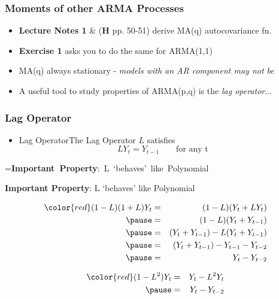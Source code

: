 \documentclass{beamer}
\makeatletter
\newcommand{\mybox}[1]{%
		\setbox0=\hbox{#1}%
		\setlength{\@tempdima}{\dimexpr\wd0+13pt}%
		\begin{tcolorbox}[colframe=ikb, colback=aliceblue ,boxrule=0.5pt,arc=4pt,
			left=6pt,right=6pt,top=6pt,bottom=6pt,boxsep=0pt,width=\@tempdima]
			#1
		\end{tcolorbox}
	}
\makeatother
\begin{document}
\begin{frame}
	\frametitle{Moments of other ARMA Processes}
	\begin{itemize}
		\large 
		\item[] \textbf{Lecture Notes 1} \& (\textbf{H} pp. 50-51) derive MA(q) autocovariance fn.
			\vspace{15pt}
		\pause 
		\item[] \textbf{Exercise 1} asks you to do the same for ARMA(1,1)
			\vspace{25pt}
		\pause 
		\item[] MA(q) always stationary - \textit{models with an AR component may not be}
			\vspace{25pt}
		\pause 
	
		\pause 
		\item[] A  useful tool to study properties of ARMA(p,q)  is the \textit{lag operator}...
		
		
		\end{itemize}
\end{frame}
	
		
		\begin{frame}
			\frametitle{Lag Operator}
			
			\begin{itemize}
				\item[] \begin{mydef*}[width=2.5in]{Lag Operator}The Lag Operator $L$ satisfies
					\begin{equation*} LY_t=Y_{t-1}   \qquad \textrm{for any t} \end{equation*} \end{mydef*}
				
				
				
				\pause
			\end{itemize}\begin{center}
				\mybox{\textbf{Important Property}: L `behaves' like Polynomial}	
			\end{center}
			\pause
	
			
			\vspace{-0.5cm}
			
			\begin{minipage}{.5\linewidth}
				\begin{eqnarray*}
				{\color{red}	(1-L)(1+L)Y_t} &=&(1-L)(Y_t+LY_t)\\ \pause
					&=&(1-L)(Y_t+Y_{t-1})\\\pause
					&=&(Y_t+Y_{t-1})-L(Y_t+Y_{t-1})\\\pause
					&=& (Y_t+Y_{t-1})-Y_{t-1} -Y_{t-2}\\\pause
					&=&Y_{t}-Y_{t-2}
				\end{eqnarray*}
			\end{minipage}\pause
			\begin{minipage}{.5\linewidth}\vspace{-2cm}
				\begin{eqnarray*}
						{\color{red}(1-L^2)Y_t} &=& Y_t-L^2 Y_{t}\\\pause
					&=& Y_t-Y_{t-2} 		\end{eqnarray*}
			\end{minipage}
			
			
		\end{frame}
\end{document}
